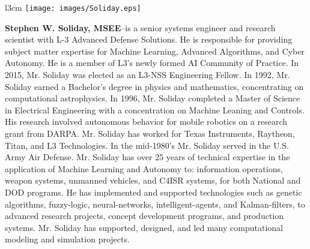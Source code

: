 \begin{wrapfigure}{l}{3cm}
\vspace{-14pt}
\texttt{[image: images/Soliday.eps]}
\end{wrapfigure}

\textbf{Stephen W. Soliday, MSEE}--is a senior systems engineer and
research scientist with L-3 Advanced Defense Solutions.
He is responsible for providing subject matter expertise for Machine
Learning, Advanced Algorithms, and Cyber Autonomy. He is a member of
L3’s newly formed AI Community of Practice.  In 2015, Mr. Soliday was
elected as an L3-NSS Engineering Fellow.  In 1992, Mr. Soliday earned
a Bachelor’s degree in physics and mathematics, concentrating on
computational astrophysics. In 1996, Mr. Soliday completed a Master of
Science in Electrical Engineering with a concentration on Machine
Leaning and Controls. His research involved autonomous behavior for
mobile robotics on a research grant from DARPA. Mr. Soliday has worked
for Texas Instruments, Raytheon, Titan, and L3 Technologies. In the
mid-1980’s Mr. Soliday served in the U.S. Army Air Defense.
Mr. Soliday has over 25 years of technical expertise in the
application of Machine Learning and Autonomy to: information
operations, weapon systems, unmanned vehicles, and C4ISR systems, for
both National and DOD programs. He has implemented and supported
technologies such as genetic algorithms, fuzzy-logic, neural-networks,
intelligent-agents, and Kalman-filters, to advanced research projects,
concept development programs, and production systems.  Mr. Soliday has
supported, designed, and led many computational modeling and
simulation projects. 
